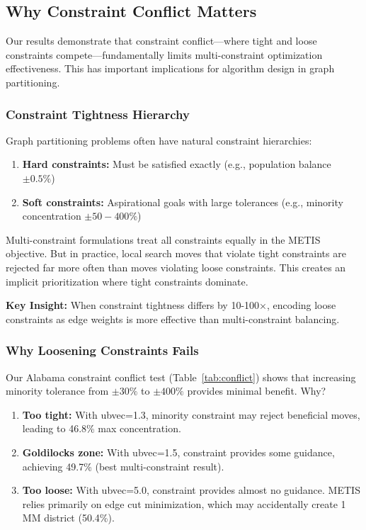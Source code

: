 \label{sec:discussion}

\subsection{Why Constraint Conflict Matters}

Our results demonstrate that constraint conflict---where tight and loose constraints compete---fundamentally limits multi-constraint optimization effectiveness. This has important implications for algorithm design in graph partitioning.

\subsubsection{Constraint Tightness Hierarchy}

Graph partitioning problems often have natural constraint hierarchies:
\begin{enumerate}
    \item \textbf{Hard constraints:} Must be satisfied exactly (e.g., population balance $\pm0.5\%$)
    \item \textbf{Soft constraints:} Aspirational goals with large tolerances (e.g., minority concentration $\pm50-400\%$)
\end{enumerate}

Multi-constraint formulations treat all constraints equally in the METIS objective. But in practice, local search moves that violate tight constraints are rejected far more often than moves violating loose constraints. This creates an implicit prioritization where tight constraints dominate.

\textbf{Key Insight:} When constraint tightness differs by 10-100×, encoding loose constraints as edge weights is more effective than multi-constraint balancing.

\subsubsection{Why Loosening Constraints Fails}

Our Alabama constraint conflict test (Table~\ref{tab:conflict}) shows that increasing minority tolerance from $\pm30\%$ to $\pm400\%$ provides minimal benefit. Why?

\begin{enumerate}
    \item \textbf{Too tight:} With ubvec=1.3, minority constraint may reject beneficial moves, leading to 46.8\% max concentration.
    \item \textbf{Goldilocks zone:} With ubvec=1.5, constraint provides some guidance, achieving 49.7\% (best multi-constraint result).
    \item \textbf{Too loose:} With ubvec=5.0, constraint provides almost no guidance. METIS relies primarily on edge cut minimization, which may accidentally create 1 MM district (50.4\%).
\end{enumerate}

